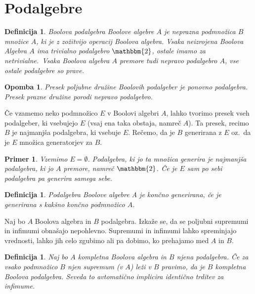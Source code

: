 \documentclass{amsart}
\newtheorem{definicija}[izrek]{Definicija}
\newtheorem{opomba}[izrek]{Opomba}
\newtheorem{primer}[izrek]{Primer}
\begin{document}


\section{Podalgebre}

\begin{definicija}
    Boolova podalgebra Boolove algebre $A$ je neprazna podmnožica $B$ množice $A$, ki je z zožitvijo operacij Boolova algebra.
    Vsaka neizrojena Boolova Algebra $A$ ima trivialno podalgebro $\mathbbm{2}$, ostale imamo za netrivialne.\
    Vsaka Boolova algebra $A$ premore tudi nepravo podalgebro $A$, vse ostale podalgebre so prave.
\end{definicija}

\begin{opomba}
    Presek poljubne družine Boolovih podalgeber je ponovno podalgebra. Presek prazne družine porodi nepravo podalgebro.
\end{opomba}

Če vzamemo neko podmnožico \(E\) v Boolovi algebri \(A\), lahko tvorimo presek vseh podalgeber, ki vsebujejo $E$ (vsaj ena taka obstaja, namreč $A$).
Ta presek, recimo $B$ je najmanjša podalgebra, ki vsebuje $E$. Rečemo, da je $B$ generirana z $E$ oz.\ da je $E$ množica generatorjev za $B$.

\begin{primer}
    Vzemimo \(E = \emptyset\). Podalgebra, ki jo ta množica generira je najmanjša podalgebra, ki jo $A$ premore, namreč $\mathbbm{2}$. Če je $E$ sam po sebi podalgebra pa generira samega sebe.
\end{primer}

\begin{definicija}
    Podalgebra Boolove algebre A je končno generirana, če je generirana s kakšno končno podmnožico $A$.
\end{definicija}

Naj bo $A$ Boolova algebra in $B$ podalgebra.
Izkaže se, da se poljubni supremumi in infimumi obnašajo nepohlevno.
Supremumi in infimumi lahko spreminjajo vrednosti, lahko jih celo zgubimo ali pa dobimo,
ko prehajamo med $A$ in $B$.

\begin{definicija}
    Naj bo $A$ kompletna Boolova algebra in $B$ njena podalgebra.
    Če za vsako podmnožico $B$ njen supremum (v $A$) leži v $B$ pravimo, da je 
    $B$ kompletna Boolova podalgebra. Seveda to avtomatično implicira identično trditev za infimume.
\end{definicija}
\end{document}
